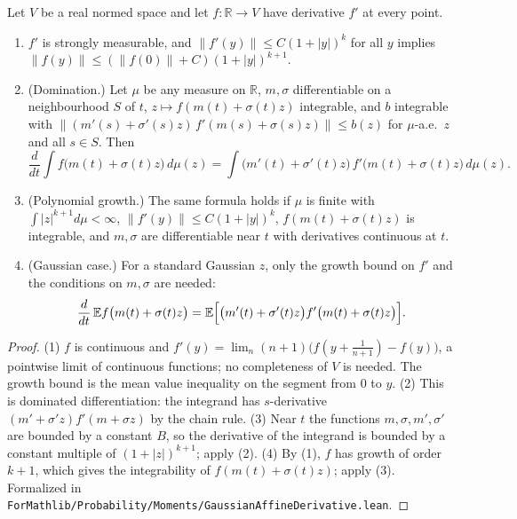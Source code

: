 \begin{lemma}\label{lem:sg-tal:st-affine-curve}
  \leanok
Let $V$ be a real normed space and let $f:\mathbb R\to V$ have derivative $f'$ at every point.
\begin{enumerate}
\item $f'$ is strongly measurable, and $\|f'(y)\|\le C(1+|y|)^k$ for all $y$ implies
$\|f(y)\|\le(\|f(0)\|+C)(1+|y|)^{k+1}$.
\item (Domination.) Let $\mu$ be any measure on $\mathbb R$, $m,\sigma$ differentiable on a neighbourhood $S$ of $t$,
$z\mapsto f(m(t)+\sigma(t)z)$ integrable, and $b$ integrable with
$\|(m'(s)+\sigma'(s)z)\,f'(m(s)+\sigma(s)z)\|\le b(z)$ for $\mu$-a.e.\ $z$ and all $s\in S$. Then
\[
\frac{d}{dt}\int f\bigl(m(t)+\sigma(t)z\bigr)\,d\mu(z)
=\int\bigl(m'(t)+\sigma'(t)z\bigr)\,f'\bigl(m(t)+\sigma(t)z\bigr)\,d\mu(z).
\]
\item (Polynomial growth.) The same formula holds if $\mu$ is finite with $\int|z|^{k+1}d\mu<\infty$,
$\|f'(y)\|\le C(1+|y|)^k$, $f(m(t)+\sigma(t)z)$ is integrable, and $m,\sigma$ are differentiable near $t$ with
derivatives continuous at $t$.
\item (Gaussian case.) For a standard Gaussian $z$, only the growth bound on $f'$ and the conditions on $m,\sigma$
are needed:
\[
\frac{d}{dt}\,\mathbb E f\bigl(m(t)+\sigma(t)z\bigr)
=\mathbb E\Bigl[\bigl(m'(t)+\sigma'(t)z\bigr)f'\bigl(m(t)+\sigma(t)z\bigr)\Bigr].
\]
\end{enumerate}
\end{lemma}
\begin{proof}
  \leanok
(1) $f$ is continuous and $f'(y)=\lim_n(n+1)\bigl(f(y+\tfrac1{n+1})-f(y)\bigr)$, a pointwise limit of continuous
functions; no completeness of $V$ is needed. The growth bound is the mean value inequality on the segment from $0$
to $y$. (2) This is dominated differentiation: the integrand has $s$-derivative
$(m'+\sigma'z)f'(m+\sigma z)$ by the chain rule. (3) Near $t$ the functions $m,\sigma,m',\sigma'$ are bounded by a
constant $B$, so the derivative of the integrand is bounded by a constant multiple of $(1+|z|)^{k+1}$; apply (2).
(4) By (1), $f$ has growth of order $k+1$, which gives the integrability of $f(m(t)+\sigma(t)z)$; apply (3).
Formalized in \texttt{ForMathlib/Probability/Moments/GaussianAffineDerivative.lean}.
\end{proof}

